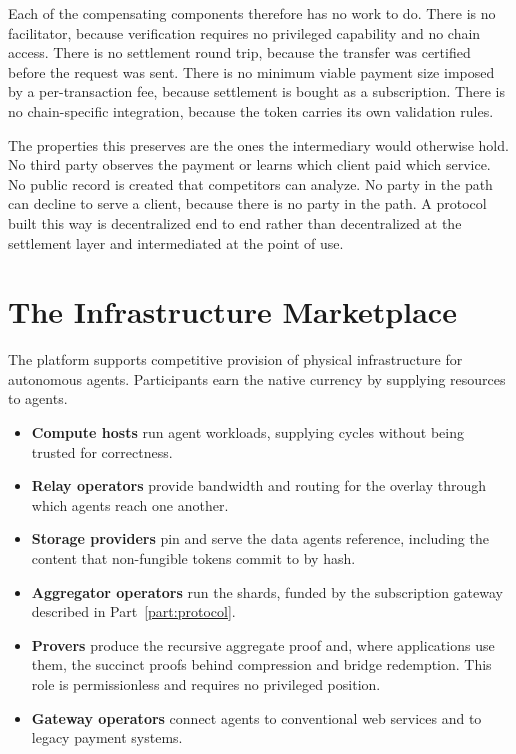 Each of the compensating components therefore has no work to do. There is no facilitator, because verification requires no privileged capability and no chain access. There is no settlement round trip, because the transfer was certified before the request was sent. There is no minimum viable payment size imposed by a per-transaction fee, because settlement is bought as a subscription. There is no chain-specific integration, because the token carries its own validation rules.

The properties this preserves are the ones the intermediary would otherwise hold. No third party observes the payment or learns which client paid which service. No public record is created that competitors can analyze. No party in the path can decline to serve a client, because there is no party in the path. A protocol built this way is decentralized end to end rather than decentralized at the settlement layer and intermediated at the point of use.

\section{The Infrastructure Marketplace}

The platform supports competitive provision of physical infrastructure for autonomous agents. Participants earn the native currency by supplying resources to agents.

\begin{itemize}
    \item \textbf{Compute hosts} run agent workloads, supplying cycles without being trusted for correctness.
    \item \textbf{Relay operators} provide bandwidth and routing for the overlay through which agents reach one another.
    \item \textbf{Storage providers} pin and serve the data agents reference, including the content that non-fungible tokens commit to by hash.
    \item \textbf{Aggregator operators} run the shards, funded by the subscription gateway described in Part~\ref{part:protocol}.
    \item \textbf{Provers} produce the recursive aggregate proof and, where applications use them, the succinct proofs behind compression and bridge redemption. This role is permissionless and requires no privileged position.
    \item \textbf{Gateway operators} connect agents to conventional web services and to legacy payment systems.
\end{itemize}

